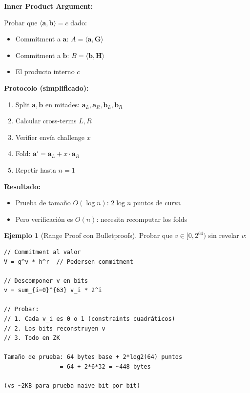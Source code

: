\documentclass[11pt,a4paper,twoside,openright]{book}
\theoremstyle{definition}
\newtheorem{example}{Ejemplo}[chapter]
\theoremstyle{plain}
\theoremstyle{remark}
\begin{document}
\begin{mathnote}
\textbf{Inner Product Argument:}

Probar que $\langle \mathbf{a}, \mathbf{b} \rangle = c$ dado:
\begin{itemize}
    \item Commitment a $\mathbf{a}$: $A = \langle \mathbf{a}, \mathbf{G} \rangle$
    \item Commitment a $\mathbf{b}$: $B = \langle \mathbf{b}, \mathbf{H} \rangle$
    \item El producto interno $c$
\end{itemize}

\textbf{Protocolo (simplificado):}
\begin{enumerate}
    \item Split $\mathbf{a}, \mathbf{b}$ en mitades: $\mathbf{a}_L, \mathbf{a}_R, \mathbf{b}_L, \mathbf{b}_R$
    \item Calcular cross-terms $L, R$
    \item Verifier envía challenge $x$
    \item Fold: $\mathbf{a}' = \mathbf{a}_L + x \cdot \mathbf{a}_R$
    \item Repetir hasta $n = 1$
\end{enumerate}

\textbf{Resultado:}
\begin{itemize}
    \item Prueba de tamaño $O(\log n)$: $2 \log n$ puntos de curva
    \item Pero verificación es $O(n)$: necesita recomputar los folds
\end{itemize}
\end{mathnote}

\begin{example}[Range Proof con Bulletproofs]
Probar que $v \in [0, 2^{64})$ sin revelar $v$:

\begin{verbatim}
// Commitment al valor
V = g^v * h^r  // Pedersen commitment

// Descomponer v en bits
v = sum_{i=0}^{63} v_i * 2^i

// Probar:
// 1. Cada v_i es 0 o 1 (constraints cuadráticos)
// 2. Los bits reconstruyen v
// 3. Todo en ZK

Tamaño de prueba: 64 bytes base + 2*log2(64) puntos
                = 64 + 2*6*32 = ~448 bytes

(vs ~2KB para prueba naive bit por bit)
\end{verbatim}
\end{example}
\end{document}
